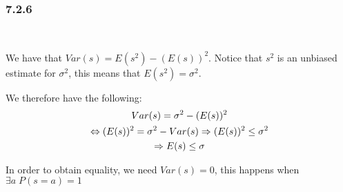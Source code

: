 \subsubsection{7.2.6}\hfill\\\par
\noindent We have that $Var(s) = E(s^2)-(E(s))^2$. Notice that $s^2$ is an unbiased estimate for $\sigma^2$, this means that $E(s^2) = \sigma^2$.\par
\noindent We therefore have the following:
\begin{equation*}
  \begin{gathered}
    Var(s) = \sigma^2 -(E(s))^2\\
    \Leftrightarrow (E(s))^2 = \sigma^2-Var(s)\Rightarrow (E(s))^2\leq\sigma^2\\
    \Rightarrow E(s)\leq\sigma
  \end{gathered}
\end{equation*}
\par\bigskip
\noindent In order to obtain equality, we need $Var(s) = 0$, this happens when $\exists a\;P(s = a) = 1$
\par\bigskip
